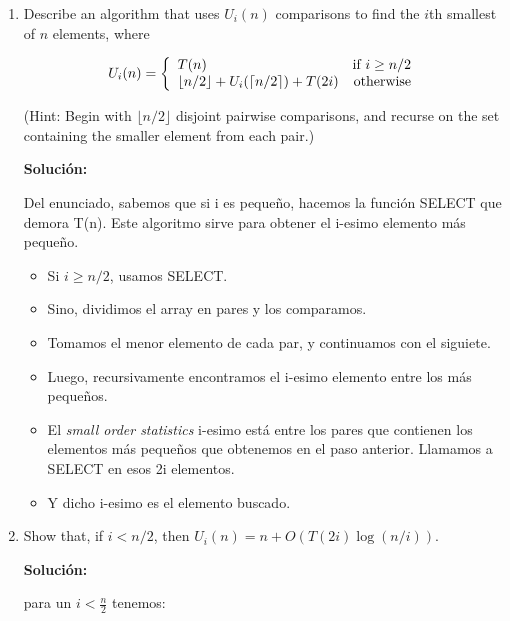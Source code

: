 \documentclass{article}
\begin{document}
\begin{enumerate}[label=\textbf{\alph*.}]
  \item Describe an algorithm that uses $U_i(n)$ comparisons to find the $i$th smallest of $n$ elements, where
  
\[
U_i(n) = \left\{
  \begin{array}{lr}
    T(n) & \textnormal{if } i \geq n/2\\
    \lfloor n/2 \rfloor + U_i(\lceil n/2\rceil) + T(2i) & \textnormal{otherwise}
  \end{array}
\right.
\]
  
  (Hint: Begin with $\lfloor n/2 \rfloor$ disjoint pairwise comparisons, and recurse on the set containing the smaller element from each pair.)
  
  \textbf{Solución:}
  
  Del enunciado, sabemos que si i es pequeño, hacemos la función SELECT que demora T(n). Este algoritmo sirve para obtener el i-esimo elemento más pequeño.

	\begin{itemize}
	\item Si $i \geq n/2$, usamos SELECT.
    \item Sino, dividimos el array en pares y los comparamos.
    \item Tomamos el menor elemento de cada par, y continuamos con el siguiete.
    \item Luego, recursivamente encontramos el i-esimo elemento entre los más pequeños.
    \item El \textit{small order statistics} i-esimo está entre los pares que contienen los elementos más pequeños que obtenemos en el paso anterior. Llamamos a SELECT en esos 2i elementos.
    \item Y dicho i-esimo es el elemento buscado.
	\end{itemize}
  
  \item Show that, if $i < n/2$, then $U_i(n) = n + O(T(2i)\log(n/i))$.
  
  \textbf{Solución:}
  
  para un $i<\frac{n}{2}$ tenemos:
  

\end{enumerate}
\end{document}
